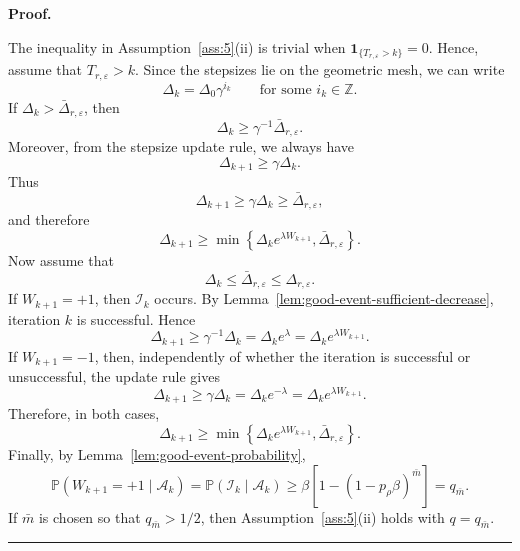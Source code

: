 \documentclass[11pt,a4paper]{article}
\newenvironment{proof}[1][Proof]{%
  \par\noindent\textbf{#1.}\ %
}{%
  \par\vspace{-0.5 ex}            %
  \noindent\hfill\rule{0.5em}{0.5em}\par
  \vspace{1ex}
}
\newcommand{\goldelta}{r}
\begin{document}
\begin{proof}
The inequality in Assumption~\ref{ass:5}(ii) is trivial when
\(\mathbf 1_{\{T_{\goldelta,\varepsilon}>k\}}=0\). Hence, assume that
\(T_{\goldelta,\varepsilon}>k\). Since the stepsizes lie on the geometric mesh, we can write
\[
    \Delta_k=\Delta_0\gamma^{i_k}
    \qquad\text{for some } i_k\in\mathbb Z.
\]
If \(\Delta_k>\bar\Delta_{\goldelta,\varepsilon}\), then
\[
    \Delta_k\ge \gamma^{-1}\bar\Delta_{\goldelta,\varepsilon}.
\]
Moreover, from the stepsize update rule, we always have
\[
    \Delta_{k+1}\ge \gamma\Delta_k.
\]
Thus
\[
    \Delta_{k+1}
    \ge
    \gamma\Delta_k
    \ge
    \bar\Delta_{\goldelta,\varepsilon},
\]
and therefore
\[
    \Delta_{k+1}
    \ge
    \min\left\{
        \Delta_k e^{\lambda W_{k+1}},
        \bar\Delta_{\goldelta,\varepsilon}
    \right\}.
\]
Now assume that
\[
    \Delta_k\le\bar\Delta_{\goldelta,\varepsilon}
    \le
    \Delta_{\goldelta,\varepsilon}.
\]
If \(W_{k+1}=+1\), then \(\mathcal I_k\) occurs. By
Lemma~\ref{lem:good-event-sufficient-decrease}, iteration \(k\) is successful.
Hence
\[
    \Delta_{k+1}
    \ge
    \gamma^{-1}\Delta_k
    =
    \Delta_k e^\lambda
    =
    \Delta_k e^{\lambda W_{k+1}}.
\]
If \(W_{k+1}=-1\), then, independently of whether the iteration is successful
or unsuccessful, the update rule gives
\[
    \Delta_{k+1}
    \ge
    \gamma\Delta_k
    =
    \Delta_k e^{-\lambda}
    =
    \Delta_k e^{\lambda W_{k+1}}.
\]
Therefore, in both cases,
\[
    \Delta_{k+1}
    \ge
    \min\left\{
        \Delta_k e^{\lambda W_{k+1}},
        \bar\Delta_{\goldelta,\varepsilon}
    \right\}.
\]
Finally, by Lemma~\ref{lem:good-event-probability},
\[
    \mathbb P(W_{k+1}=+1\mid\mathcal A_k)
    =
    \mathbb P(\mathcal I_k\mid\mathcal A_k)
    \ge
    \beta\left[1-(1-p_\rho\beta)^{\bar{m}}\right]
    =
    q_{\bar{m}}.
\]
If \(\bar{m}\) is chosen so that \(q_{\bar{m}}>1/2\), then
Assumption~\ref{ass:5}(ii) holds with \(q=q_{\bar{m}}\).
\end{proof}
\end{document}
